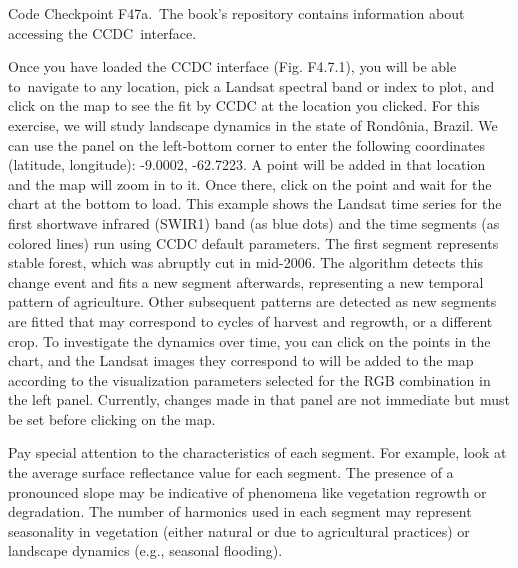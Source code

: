 \documentclass[
  letterpaper,
  DIV=11,
  numbers=noendperiod]{scrreprt}
\begin{document}
\begin{tcolorbox}[enhanced jigsaw, left=2mm, breakable, rightrule=.15mm, opacityback=0, colframe=quarto-callout-note-color-frame, colbacktitle=quarto-callout-note-color!10!white, arc=.35mm, opacitybacktitle=0.6, toptitle=1mm, colback=white, leftrule=.75mm, title=\textcolor{quarto-callout-note-color}{\faInfo}\hspace{0.5em}{Note}, toprule=.15mm, bottomtitle=1mm, titlerule=0mm, bottomrule=.15mm, coltitle=black]

Code Checkpoint F47a.~The book's repository contains information about
accessing the CCDC~interface.

\end{tcolorbox}

Once you have loaded the CCDC interface (Fig. F4.7.1), you will be able
to~navigate to any location, pick a Landsat spectral band or index to
plot, and click on the map to see the fit by CCDC at the location you
clicked. For this exercise, we will study landscape dynamics in the
state of Rondônia, Brazil. We can use the panel on the left-bottom
corner to enter the following coordinates (latitude, longitude):
-9.0002, -62.7223. A point will be added in that location and the map
will zoom in to it. Once there, click on the point and wait for the
chart at the bottom to load. This example shows the Landsat time series
for the first shortwave infrared (SWIR1) band (as blue dots) and the
time segments (as colored lines) run using CCDC default parameters. The
first segment represents stable forest, which was abruptly cut in
mid-2006. The algorithm detects this change event and fits a new segment
afterwards, representing a new temporal pattern of agriculture. Other
subsequent patterns are detected as new segments are fitted that may
correspond to cycles of harvest and regrowth, or a different crop. To
investigate the dynamics over time, you can click on the points in the
chart, and the Landsat images they correspond to will be added to the
map according to the visualization parameters selected for the RGB
combination in the left panel. Currently, changes made in that panel are
not immediate but must be set before clicking on the map.~

Pay special attention to the characteristics of each segment. For
example, look at the average surface reflectance value for each segment.
The presence of a pronounced slope may be indicative of phenomena like
vegetation regrowth or degradation. The number of harmonics used in each
segment may represent seasonality in vegetation (either natural or due
to agricultural practices) or landscape dynamics (e.g., seasonal
flooding).
\end{document}
